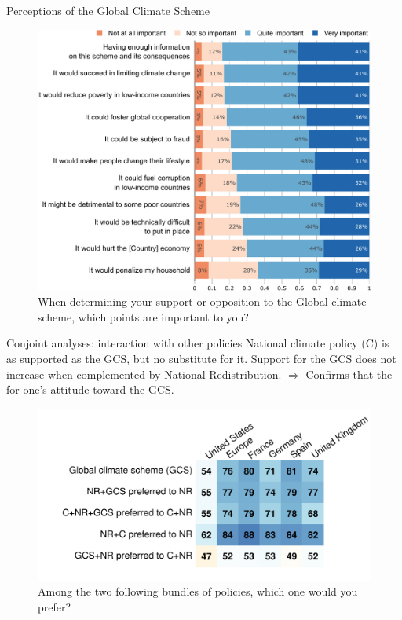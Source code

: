 \documentclass[aspectratio=169,xcolor=dvipsnames, 11pt,mathserif]{beamer}
\begin{document}
\begin{frame}{Perceptions of the Global Climate Scheme \hyperlink{gcs_support}{}\label{gcs_perceptions}}
	\vspace{-.3cm}
    \begin{figure}
        \centering 
        \caption{When determining your support or opposition to the Global climate scheme, which points are important to you?}
        \vspace{-.2cm}
        \includegraphics[height=.9\textheight]{../figures/all/gcs_important.pdf} 
    \end{figure}
\end{frame}

\begin{frame}{Conjoint analyses: interaction with other policies \hyperlink{gcs_support}{}\label{conjoint_ab}} 
    \bbvs \ip National climate policy (C) is as supported as the GCS, but no substitute for it.
	\ip Support for the GCS does not increase when complemented by National Redistribution.
	\ip $\Rightarrow$ Confirms that the  for one's attitude toward the GCS.
    \ee
    \begin{figure} \vspace*{-.5cm}
        \centering 
        \caption{Among the two following bundles of policies, which one would you prefer?}
        \vspace{-.2cm} 
        \includegraphics[height=.65\textheight]{../figures/country_comparison/conjoint_ab_positive.pdf} 
    \end{figure}
\end{frame}
\end{document}
